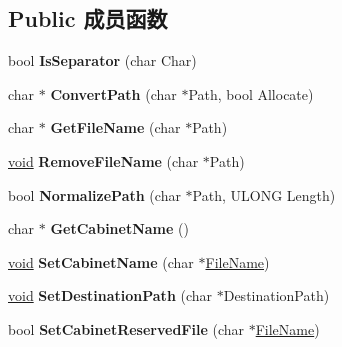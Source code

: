 \subsection*{Public 成员函数}
\begin{DoxyCompactItemize}
\item 
\mbox{\label{class_c_cabinet_ac68d9ae75dce2ba5018ae7b91206ce9e}} 
bool {\bfseries Is\+Separator} (char Char)
\item 
\mbox{\label{class_c_cabinet_af47d9bfdaee84b127e472b8574092345}} 
char $\ast$ {\bfseries Convert\+Path} (char $\ast$Path, bool Allocate)
\item 
\mbox{\label{class_c_cabinet_ae2dc1675de9ad0b3ee594389cede6f26}} 
char $\ast$ {\bfseries Get\+File\+Name} (char $\ast$Path)
\item 
\mbox{\label{class_c_cabinet_aba7832a419505a7c815ab1739a9ae1c8}} 
\hyperlink{interfacevoid}{void} {\bfseries Remove\+File\+Name} (char $\ast$Path)
\item 
\mbox{\label{class_c_cabinet_a5c003314df4505c1c85148b236af8267}} 
bool {\bfseries Normalize\+Path} (char $\ast$Path, U\+L\+O\+NG Length)
\item 
\mbox{\label{class_c_cabinet_af5cb6a5cb3ef605c1b8b7aeb16b127d6}} 
char $\ast$ {\bfseries Get\+Cabinet\+Name} ()
\item 
\mbox{\label{class_c_cabinet_aff44e4711d1a5c116ea637f2b025395f}} 
\hyperlink{interfacevoid}{void} {\bfseries Set\+Cabinet\+Name} (char $\ast$\hyperlink{struct___file_name}{File\+Name})
\item 
\mbox{\label{class_c_cabinet_abed4769209a9f536eea5d91b71225cb0}} 
\hyperlink{interfacevoid}{void} {\bfseries Set\+Destination\+Path} (char $\ast$Destination\+Path)
\item 
\mbox{\label{class_c_cabinet_a1e061bc9468f1e1368966f468b2968b8}} 
bool {\bfseries Set\+Cabinet\+Reserved\+File} (char $\ast$\hyperlink{struct___file_name}{File\+Name})
\item 
\mbox{\label{class_c_cabinet_a3c47305014a7d6f4da02cdbc037b57fc}} 

\end{DoxyCompactItemize}
